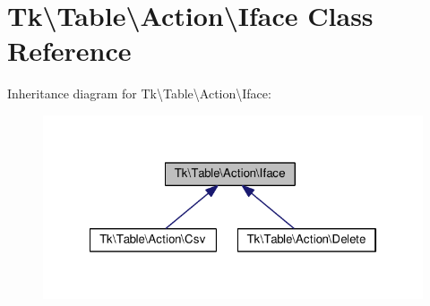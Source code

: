 \hypertarget{classTk_1_1Table_1_1Action_1_1Iface}{\section{Tk\textbackslash{}Table\textbackslash{}Action\textbackslash{}Iface Class Reference}
\label{classTk_1_1Table_1_1Action_1_1Iface}
}


Inheritance diagram for Tk\textbackslash{}Table\textbackslash{}Action\textbackslash{}Iface\+:\nopagebreak
\begin{figure}[H]
\begin{center}
\leavevmode
\includegraphics[width=322pt]{classTk_1_1Table_1_1Action_1_1Iface__inherit__graph}
\end{center}
\end{figure}
